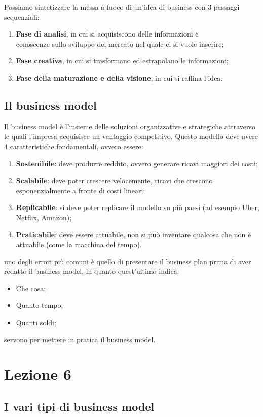 \documentclass[14pt]{extarticle}
\begin{document}
Possiamo sintetizzare la messa a fuoco di un'idea di business con 3 passaggi
sequenziali:

\begin{enumerate}
    \item \textbf{Fase di analisi}, in cui si acquisiscono delle informazioni e
    \\ conoscenze sullo sviluppo del mercato nel quale ci si vuole inserire;
    \item \textbf{Fase creativa}, in cui si trasformano ed estrapolano le
    informazioni;
    \item \textbf{Fase della maturazione e della visione}, in cui si raffina
    l'idea. 
\end{enumerate}

\subsection{Il business model}

Il business model è l'insieme delle soluzioni organizzative e strategiche
attraverso le quali l'impresa acquisisce un vantaggio competitivo. Questo
modello deve avere 4 caratteristiche fondamentali, ovvero essere:

\begin{enumerate}
    \item \textbf{Sostenibile}: deve produrre reddito, ovvero generare ricavi
    maggiori dei costi;
    \item \textbf{Scalabile}: deve poter crescere velocemente, ricavi che
    crescono esponenzialmente a fronte di costi lineari;
    \item \textbf{Replicabile}: si deve poter replicare il modello su più paesi
    (ad esempio Uber, Netflix, Amazon);
    \item \textbf{Praticabile}: deve essere attuabile, non si può inventare
    qualcosa che non è attuabile (come la macchina del tempo).  
\end{enumerate}
uno degli errori più comuni è quello di presentare il business plan prima di
aver redatto il business model, in quanto quest'ultimo indica:
\begin{itemize}
    \item Che cosa;
    \item Quanto tempo;
    \item Quanti soldi;
\end{itemize}
servono per mettere in pratica il business model.

\newpage
\section{Lezione 6}

\subsection{I vari tipi di business model}
\end{document}
